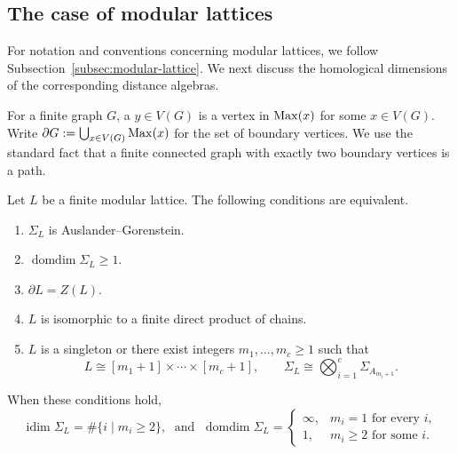 \documentclass[a4paper,leqno]{amsart}
\begin{document}
\subsection{The case of modular lattices}

For notation and conventions concerning modular lattices, we follow Subsection~\ref{subsec:modular-lattice}. We next discuss the homological dimensions of the corresponding distance algebras.

For a finite graph $G$, a  $y\in V(G)$ is a vertex in $\operatorname{Max}(x)$ for some $x\in V(G)$.
Write $\partial G:=\bigcup_{x\in V(G)}\operatorname{Max}(x)$ for the set of boundary vertices.
We use the standard fact that a finite connected graph with exactly two boundary vertices is a path. 

\begin{thm}\label{thm:modular-lattice-AG}
Let $L$ be a finite modular lattice. The following conditions are
equivalent.
\begin{enumerate}
    \item $\Sigma_L$ is Auslander--Gorenstein.
    \item $\operatorname{domdim}\Sigma_L\geq1$.
    \item $\partial L=Z(L)$.
    \item $L$ is isomorphic to a finite direct product of chains.
    \item $L$ is a singleton or there exist integers $m_1,\ldots,m_c\geq1$ such that
    \[
    L\cong[m_1+1]\times\cdots\times[m_c+1],
    \qquad
    \Sigma_L\cong\bigotimes_{i=1}^c\Sigma_{A_{m_i+1}}.
    \]
\end{enumerate}
When these conditions hold,
\[
\operatorname{idim}\Sigma_L
=\#\{i\mid m_i\geq2\},\; \text{ and }\;
\operatorname{domdim}\Sigma_L=
\begin{cases}
\infty, & m_i=1\text{ for every }i,\\
1, & m_i\geq2\text{ for some }i.
\end{cases}
\]
\end{thm}
\end{document}
